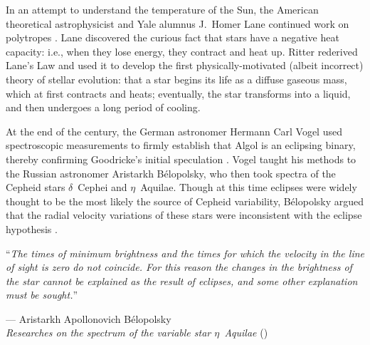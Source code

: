 In an attempt to understand the temperature of the Sun, the American theoretical astrophysicist and Yale alumnus J.\ Homer Lane continued work on polytropes \citep[e.g.,][]{1870AmJS...50...57L}. 
Lane discovered the curious fact that stars have a negative heat capacity: i.e., when they lose energy, they contract and heat up. 
Ritter rederived Lane's Law and used it to develop the first physically-motivated (albeit incorrect) theory of stellar evolution: that a star begins its life as a diffuse gaseous mass, which at first contracts and heats; eventually, the star transforms into a liquid, and then undergoes a long period of cooling. 


At the end of the century, the German astronomer Hermann Carl Vogel used spectroscopic measurements to firmly establish that Algol is an eclipsing binary, thereby confirming Goodricke's initial speculation \citep{1889AN....121..241V, 1908ApJ....27....1F}. 
Vogel taught his methods to the Russian astronomer Aristarkh B{\'e}lopolsky, who then took spectra of the Cepheid stars $\delta$~Cephei and $\eta$~Aquilae. 
Though at this time eclipses were widely thought to be the most likely the source of Cepheid variability, B{\'e}lopolsky argued that the radial velocity variations of these stars were inconsistent with the eclipse hypothesis \citep{1897ApJ.....6..393B, 1895ApJ.....1..160B}. 
\epigraph{``\emph{The times of minimum brightness and the times for which the velocity in the line \hphantom{``}of sight is zero do not coincide. For this reason the changes in the brightness of \hphantom{``}the star cannot be explained as the result of eclipses, and some other explanation \hphantom{``}must be sought.}''}{--- Aristarkh Apollonovich B{\'e}lopolsky \\\textit{Researches on the spectrum of the variable star $\eta$~Aquilae} (\citeyear{1897ApJ.....6..393B})}

